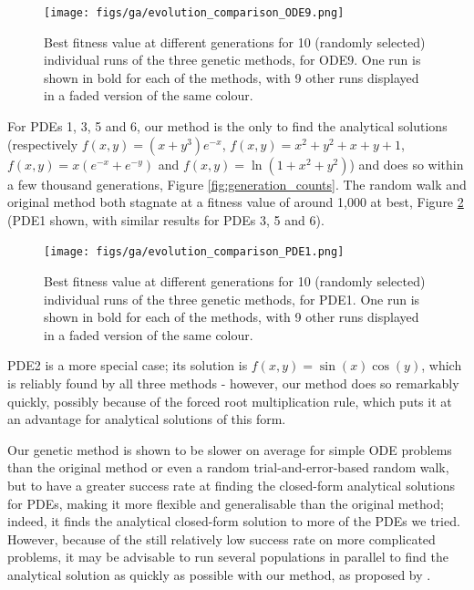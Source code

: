 \documentclass[aps,reprint,superscriptaddress,nofootinbib]{revtex4-2}
\begin{document}
    \begin{figure}[htp]
        \centering
        \texttt{[image: figs/ga/evolution\_comparison\_ODE9.png]}
        \caption{Best fitness value at different generations for 10 (randomly selected) individual runs of the three genetic methods, for ODE9. One run is shown in bold for each of the methods, with 9 other runs displayed in a faded version of the same colour.}
        \label{fig:ode9_res}
    \end{figure}
    
    For PDEs 1, 3, 5 and 6, our method is the only to find the analytical solutions (respectively \(f(x, y) = (x+y^3)e^{-x}\), \(f(x, y) = x^2 + y^2 + x + y + 1\), \(f(x, y) = x\left(e^{-x} + e^{-y}\right)\) and \(f(x, y) = \ln(1+x^2+y^2)\)) and does so within a few thousand generations, Figure \ref{fig:generation_counts}. The random walk and original method both stagnate at a fitness value of around 1,000 at best, Figure \ref{fig:pde1_res} (PDE1 shown, with similar results for PDEs 3, 5 and 6).
    
    \begin{figure}[htp]
        \centering
        \texttt{[image: figs/ga/evolution\_comparison\_PDE1.png]}
        \caption{Best fitness value at different generations for 10 (randomly selected) individual runs of the three genetic methods, for PDE1. One run is shown in bold for each of the methods, with 9 other runs displayed in a faded version of the same colour.}
        \label{fig:pde1_res}
    \end{figure}
    
    PDE2 is a more special case; its solution is \(f(x, y) = \sin(x)\cos(y)\), which is reliably found by all three methods - however, our method does so remarkably quickly, possibly because of the forced root multiplication rule, which puts it at an advantage for analytical solutions of this form.
    
    Our genetic method is shown to be slower on average for simple ODE problems than the original method or even a random trial-and-error-based random walk, but to have a greater success rate at finding the closed-form analytical solutions for PDEs, making it more flexible and generalisable than the original method; indeed, it finds the analytical closed-form solution to more of the PDEs we tried. However, because of the still relatively low success rate on more complicated problems, it may be advisable to run several populations in parallel to find the analytical solution as quickly as possible with our method, as proposed by \cite{parameterless_ga}.
\end{document}
